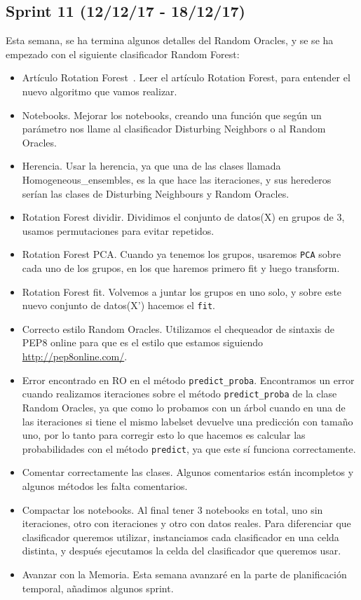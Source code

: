 \subsection{Sprint 11 (12/12/17 - 18/12/17)}
Esta semana, se ha termina algunos detalles del Random Oracles, y se se ha empezado con el siguiente clasificador Random Forest:
\begin{itemize}
\item Artículo Rotation Forest~\cite{rotationforest}. Leer el artículo Rotation Forest, para entender el nuevo algoritmo que vamos realizar.
\item Notebooks. Mejorar los notebooks, creando una función que según un parámetro nos llame al clasificador Disturbing Neighbors o al Random Oracles.
\item Herencia. Usar la herencia, ya que una de las clases llamada Homogeneous\_ensembles, es la que hace las iteraciones, y sus herederos serían las clases de Disturbing Neighbours y Random Oracles.
\item Rotation Forest dividir. Dividimos el conjunto de datos(X) en grupos de 3, usamos permutaciones para evitar repetidos.
\item Rotation Forest PCA. Cuando ya tenemos los grupos, usaremos \texttt{PCA} sobre cada uno de los grupos, en los que haremos primero fit y luego transform.
\item Rotation Forest fit. Volvemos a juntar los grupos en uno solo, y sobre este nuevo conjunto de datos(X') hacemos el \texttt{fit}.
\item Correcto estilo Random Oracles. Utilizamos el chequeador de sintaxis de PEP8 online para que es el estilo que estamos siguiendo \url{http://pep8online.com/}.
\item Error encontrado en RO en el método \texttt{predict\_proba}. Encontramos un error cuando realizamos iteraciones sobre el método \texttt{predict\_proba} de la clase Random Oracles, ya que como lo probamos con un árbol cuando en una de las iteraciones si tiene el mismo labelset devuelve una predicción con tamaño uno, por lo tanto para corregir esto lo que hacemos es calcular las probabilidades con el método \texttt{predict}, ya que este sí funciona correctamente.
\item Comentar correctamente las clases. Algunos comentarios están incompletos y algunos métodos les falta comentarios.
\item Compactar los notebooks. Al final tener 3 notebooks en total, uno sin iteraciones, otro con iteraciones y otro con datos reales. Para diferenciar que clasificador queremos utilizar, instanciamos cada clasificador en una celda distinta, y después ejecutamos la celda del clasificador que queremos usar.
\item Avanzar con la Memoria. Esta semana avanzaré en la parte de planificación temporal, añadimos algunos sprint.
\end{itemize}

